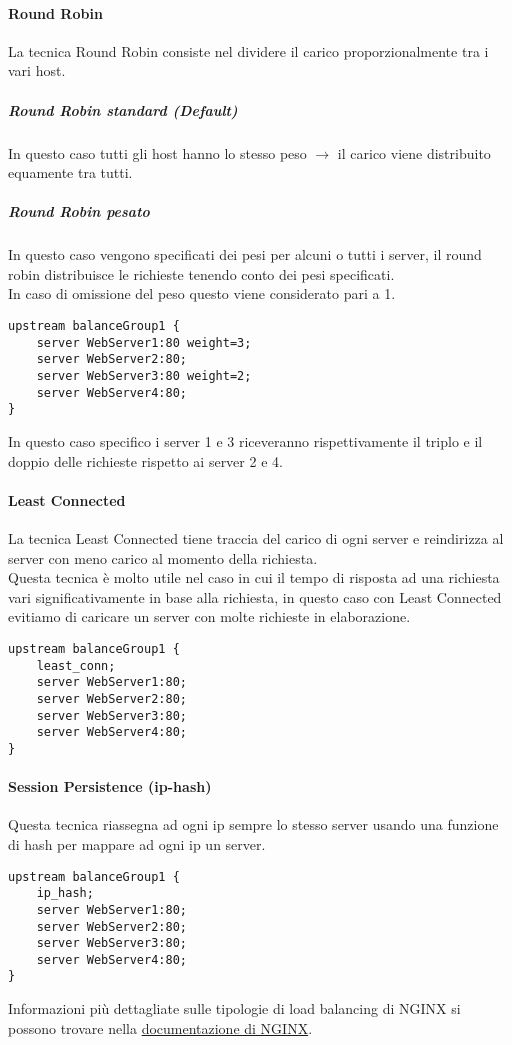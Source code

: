 \documentclass[../DocumentazioneProgetto.tex]{subfiles}
\begin{document}
	\paragraph{Round Robin}
	La tecnica Round Robin consiste nel dividere il carico proporzionalmente tra i vari host.
	\subparagraph{Round Robin standard (Default)} In questo caso tutti gli host hanno lo stesso peso \(\rightarrow \) il carico viene distribuito equamente tra tutti.
	\subparagraph{Round Robin pesato} In questo caso vengono specificati dei pesi per alcuni o tutti i server, il round robin distribuisce le richieste tenendo conto dei pesi specificati.\\
	In caso di omissione del peso questo viene considerato pari a 1.
	\begin{lstlisting}[caption=Round Robin pesato]
upstream balanceGroup1 {
	server WebServer1:80 weight=3;
	server WebServer2:80;
	server WebServer3:80 weight=2;
	server WebServer4:80;
}\end{lstlisting}
	In questo caso specifico i server 1 e 3 riceveranno rispettivamente il triplo e il doppio delle richieste rispetto ai server 2 e 4.
	\paragraph{Least Connected} La tecnica Least Connected tiene traccia del carico di ogni server e reindirizza al server con meno carico al momento della richiesta.\\
	Questa tecnica è molto utile nel caso in cui il tempo di risposta ad una richiesta vari significativamente in base alla richiesta, in questo caso con Least Connected
	evitiamo di caricare un server con molte richieste in elaborazione.
\begin{lstlisting}[caption=Least Connected]
upstream balanceGroup1 {
	least_conn;
	server WebServer1:80;
	server WebServer2:80;
	server WebServer3:80;
	server WebServer4:80;
}\end{lstlisting}
	\paragraph{Session Persistence (ip-hash)} Questa tecnica riassegna ad ogni ip sempre lo stesso server usando una funzione di hash per mappare ad ogni ip un server.
\begin{lstlisting}[caption=Session Persistence]
upstream balanceGroup1 {
	ip_hash;
	server WebServer1:80;
	server WebServer2:80;
	server WebServer3:80;
	server WebServer4:80;
}\end{lstlisting}
	Informazioni più dettagliate sulle tipologie di load balancing di NGINX si possono trovare nella \href{https://nginx.org/en/docs/http/load_balancing.html}{documentazione di NGINX}.
\end{document}
